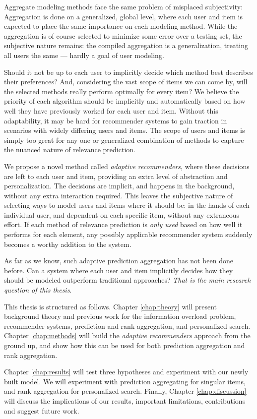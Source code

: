 Aggregate modeling methods face the same problem of misplaced subjectivity: 
Aggregation is done on a generalized, global level,
where each user and item is expected to place the same importance on each modeling method.
While the aggregation is of course selected to minimize some error over a testing set,
the subjective nature remains: the compiled aggregation is a generalization,
treating all users the same --- hardly a goal of user modeling.

Should it not be up to each user to implicitly decide which method best describes their preferences?
And, considering the vast scope of items we can come by, will the selected
methods really perform optimally for every item?
We believe the priority of each algorithm should be implicitly and automatically
based on how well they have previously worked for each user and item.
Without this adaptability, it may be hard for recommender systems
to gain traction in scenarios with widely differing users and items.
The scope of users and items is simply too great for any one or generalized combination
of methods to capture the nuanced nature of relevance prediction.

We propose a novel method called \emph{adaptive recommenders}, where these decisions are left to each user and item,
providing an extra level of abstraction and personalization.
The decisions are implicit, and happens in the background, without any extra interaction required.
This leaves the subjective nature of selecting ways to model users and items where it should be:
in the hands of each individual user, and dependent on each specific item, without any extraneous effort.
If each method of relevance prediction is \emph{only used} based on how well it performs for each element,
any possibly applicable recommender system suddenly becomes a worthy addition to the system.

As far as we know, such adaptive prediction aggregation has not been done before.
Can a system where each user and item implicitly decides how they should be modeled outperform traditional approaches?
\emph{That is the main research question of this thesis}.

\hr

\noindent
This thesis is structured as follows.
Chapter \ref{chap:theory} will present background theory and previous work for
the information overload problem, recommender systems, 
prediction and rank aggregation, and personalized search. 
Chapter \ref{chap:methods} will build the \emph{adaptive recommenders} approach from the ground up,
and show how this can be used for both prediction aggregation and rank aggregation.

Chapter \ref{chap:results} will test three hypotheses and experiment with our newly built model.
We will experiment with prediction aggregating for singular items, and rank aggregation for personalized search.
Finally, Chapter \ref{chap:discussion} will discuss the implications of our results,
important limitations, contributions and suggest future work.



